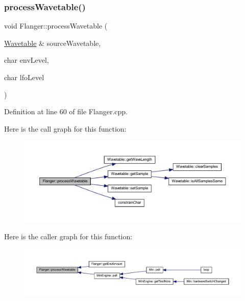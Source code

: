 \subsubsection{\texorpdfstring{process\+Wavetable()}{processWavetable()}}
{\footnotesize\ttfamily void Flanger\+::process\+Wavetable (\begin{DoxyParamCaption}\item[{\hyperlink{class_wavetable}{Wavetable} \&}]{source\+Wavetable,  }\item[{char}]{env\+Level,  }\item[{char}]{lfo\+Level }\end{DoxyParamCaption})}



Definition at line 60 of file Flanger.\+cpp.

Here is the call graph for this function\+:
\nopagebreak
\begin{figure}[H]
\begin{center}
\leavevmode
\includegraphics[width=350pt]{class_flanger_af0c970c914193ea326ca177869f508c1_cgraph}
\end{center}
\end{figure}
Here is the caller graph for this function\+:
\nopagebreak
\begin{figure}[H]
\begin{center}
\leavevmode
\includegraphics[width=350pt]{class_flanger_af0c970c914193ea326ca177869f508c1_icgraph}
\end{center}
\end{figure}
\mbox{\label{class_flanger_a382a9889299da650998fe547dd859c5f}} 
